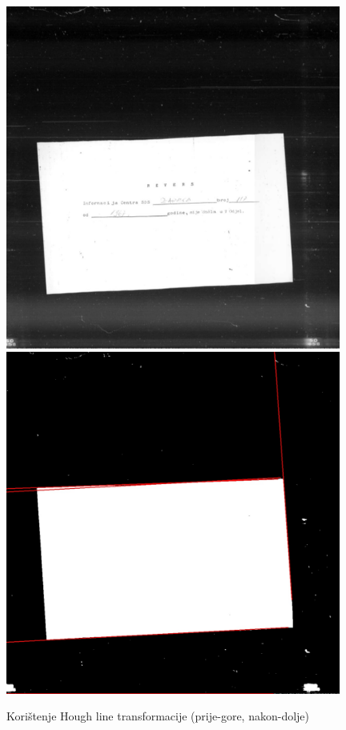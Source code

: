\documentclass[times, utf8, zavrsni, numeric]{fer}
\begin{document}
\begin{figure}
\centering
    \includegraphics[width=11cm]{images/Z05353721.jpg}
    \includegraphics[width=11cm]{images/Z05353721_draw.jpg}
    \caption{Korištenje Hough line transformacije (prije-gore, nakon-dolje)}
    \label{fig:houghline}
\end{figure}
\pagebreak
\end{document}

